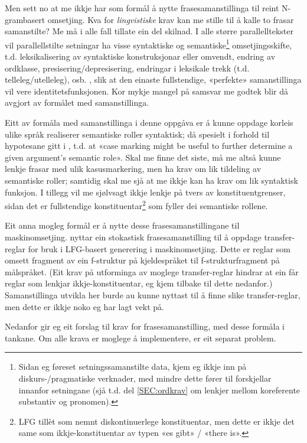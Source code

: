 \documentclass[11pt,a4paper,oneside,draft]{book}
\begin{document}
Men sett no at me ikkje har som formål å nytte frasesamanstillinga til
reint N-grambasert omsetjing. Kva for \emph{lingvistiske} krav kan me
stille til å kalle to frasar samanstilte? Me må i alle fall tillate
ein del skilnad.  I alle større parallelltekster vil parallellstilte
setningar ha visse syntaktiske og semantiske\footnote{Sidan eg føreset setningssamanstilte data, kjem eg ikkje inn på
 diskurs-/pragmatiske verknader, med mindre dette fører til
 forskjellar innanfor setningane (sjå t.d. del \ref{SEC:ordkrav} om
 lenkjer mellom koreferente substantiv og pronomen). } omsetjingsskifte,
t.d. leksikalisering av syntaktiske konstruksjonar eller omvendt,
endring av ordklasse, presisering/depresisering, endringar i leksikale
trekk (t.d. telleleg/utelleleg),
osb. \citep[s.~56--62]{munday2001its}, slik at den einaste
fullstendige, «perfekte» samanstillinga vil vere
identitetsfunksjonen. Kor mykje mangel på samsvar me godtek blir då
avgjort av formålet med samanstillinga.

Eitt av formåla med samanstillinga i denne oppgåva er å kunne oppdage
korleis ulike språk realiserer semantiske roller syntaktisk; då
spesielt i forhold til hypotesane gitt i \citet[s.~7]{xpar2008rcn},
t.d. at «case marking might be useful to further determine a given
argument's semantic role». Skal me finne det siste, må me altså kunne
lenkje frasar med ulik kasusmarkering, men ha krav om lik tildeling av
semantiske roller; samtidig skal me sjå at me ikkje kan ha krav om lik
syntaktisk funksjon. I tillegg vil me sjølvsagt ikkje lenkje på tvers
av konstituentgrenser, sidan det er fullstendige konstituentar\footnote{LFG tillèt som nemnt diskontinuerlege konstituentar, men dette
        er ikkje det same som ikkje-konstituentar av typen «es gibt» /
        «there is». }
som fyller dei semantiske rollene.

Eit anna mogleg formål er å nytte desse frasesamanstillingane til
maskinomsetjing. \citet{riezler2006gmt} nyttar ein stokastisk
frasesamanstilling til å oppdage transfer-reglar for bruk i LFG-basert
generering i maskinomsetjing. Dette er reglar som omsett fragment av
ein f-struktur på kjeldespråket til f-strukturfragment på
målspråket. (Eit krav på utforminga av moglege transfer-reglar hindrar
at ein får reglar som lenkjar ikkje-konstituentar, eg kjem tilbake til
dette nedanfor.)  Samanstillinga utvikla her burde au kunne nyttast
til å finne slike transfer-reglar, men dette er ikkje noko eg har lagt
vekt på.

Nedanfor gir eg eit forslag til krav for frasesamanstilling, med desse
formåla i tankane. Om alle krava er moglege å implementere, er eit
separat problem.
\end{document}
